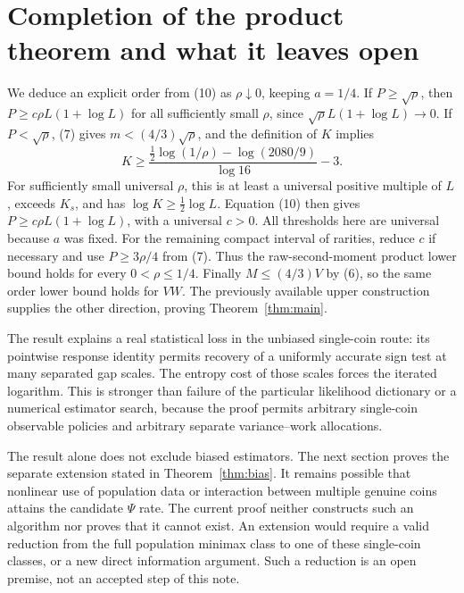 \documentclass[11pt]{article}
\begin{document}
\section{Completion of the product theorem and what it leaves open}
We deduce an explicit order from (10) as $\rho\downarrow0$, keeping $a=1/4$.
If $P\ge\sqrt\rho$, then $P\ge c\rho L(1+\log L)$ for all sufficiently small
$\rho$, since $\sqrt\rho L(1+\log L)\to0$.
If $P<\sqrt\rho$, (7) gives $m<(4/3)\sqrt\rho$, and the definition of $K$
implies
\[
 K\ge\frac{\tfrac12\log(1/\rho)-\log(2080/9)}{\log16}-3.
\]
For sufficiently small universal $\rho$, this is at least a universal positive
multiple of $L$, exceeds $K_s$, and has $\log K\ge\tfrac12\log L$.
Equation (10) then gives $P\ge c\rho L(1+\log L)$, with a universal $c>0$.
All thresholds here are universal because $a$ was fixed.
For the remaining compact interval of rarities, reduce $c$ if necessary and use
$P\ge3\rho/4$ from (7). Thus the raw-second-moment product lower bound holds
for every $0<\rho\le1/4$.
Finally $M\le(4/3)V$ by (6), so the same order lower bound holds for $VW$.
The previously available upper construction supplies the other direction,
proving Theorem~\ref{thm:main}.

The result explains a real statistical loss in the unbiased single-coin route:
its pointwise response identity permits recovery of a uniformly accurate sign
test at many separated gap scales. The entropy cost of those scales forces the
iterated logarithm. This is stronger than failure of the particular likelihood
dictionary or a numerical estimator search, because the proof permits arbitrary
single-coin observable policies and arbitrary separate variance--work allocations.

The result alone does not exclude biased estimators. The next section proves
the separate extension stated in Theorem~\ref{thm:bias}. It remains possible
that nonlinear use of population data or interaction between multiple genuine
coins attains the candidate
$\Psi$ rate. The current proof neither constructs such an algorithm nor proves
that it cannot exist. An extension would require a valid reduction from the
full population minimax class to one of these single-coin classes, or a new direct
information argument. Such a reduction is an open premise, not an accepted
step of this note.
\end{document}
